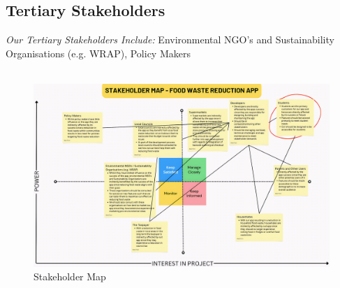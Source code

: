 \subsection{Tertiary Stakeholders}
	\indent\indent \textit{Our Tertiary Stakeholders Include:} Environmental NGO’s and Sustainability Organisations (e.g. WRAP), Policy Makers\\
    \\

\begin{figure}[h!]
\centering
\includegraphics[width=1\linewidth]{Stakeholder Map - FWRA_imgupscaler.ai_General_4K.jpg}
\caption{\label{fig: Stakeholder Map}Stakeholder Map}
\end{figure}




